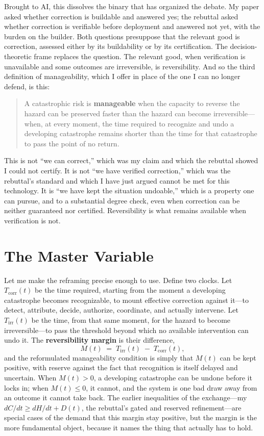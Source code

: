 \documentclass[11pt]{article}
\begin{document}
Brought to AI, this dissolves the binary that has organized the debate. My paper asked whether correction is buildable and answered yes; the rebuttal asked whether correction is verifiable before deployment and answered not yet, with the burden on the builder. Both questions presuppose that the relevant good is correction, assessed either by its buildability or by its certification. The decision-theoretic frame replaces the question. The relevant good, when verification is unavailable and some outcomes are irreversible, is reversibility. And so the third definition of manageability, which I offer in place of the one I can no longer defend, is this:

\begin{quote}
A catastrophic risk is \textbf{manageable} when the capacity to reverse the hazard can be preserved faster than the hazard can become irreversible---when, at every moment, the time required to recognize and undo a developing catastrophe remains shorter than the time for that catastrophe to pass the point of no return.
\end{quote}

This is not ``we can correct,'' which was my claim and which the rebuttal showed I could not certify. It is not ``we have verified correction,'' which was the rebuttal's standard and which I have just argued cannot be met for this technology. It is ``we have kept the situation undoable,'' which is a property one can pursue, and to a substantial degree check, even when correction can be neither guaranteed nor certified. Reversibility is what remains available when verification is not.

\section{The Master Variable}
\label{sec:master}

Let me make the reframing precise enough to use. Define two clocks. Let $T_{\mathrm{corr}}(t)$ be the time required, starting from the moment a developing catastrophe becomes recognizable, to mount effective correction against it---to detect, attribute, decide, authorize, coordinate, and actually intervene. Let $T_{\mathrm{irr}}(t)$ be the time, from that same moment, for the hazard to become irreversible---to pass the threshold beyond which no available intervention can undo it. The \textbf{reversibility margin} is their difference,
\[
M(t) \;=\; T_{\mathrm{irr}}(t) \;-\; T_{\mathrm{corr}}(t),
\]
and the reformulated manageability condition is simply that $M(t)$ can be kept positive, with reserve against the fact that recognition is itself delayed and uncertain. When $M(t) > 0$, a developing catastrophe can be undone before it locks in; when $M(t) \leq 0$, it cannot, and the system is one bad draw away from an outcome it cannot take back. The earlier inequalities of the exchange---my $dC/dt \geq dH/dt + D(t)$, the rebuttal's gated and reserved refinement---are special cases of the demand that this margin stay positive, but the margin is the more fundamental object, because it names the thing that actually has to hold.
\end{document}
